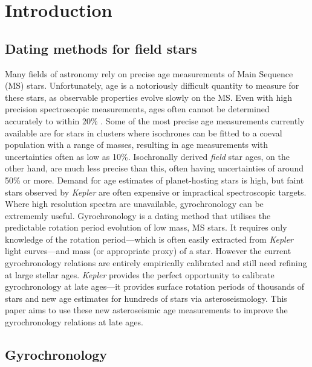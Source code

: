 \documentclass[useAMS, usenatbib]{mn2e}
\begin{document}
\section{Introduction}
\label{intro}
\subsection{Dating methods for field stars}

Many fields of astronomy rely on precise age measurements of Main Sequence
(MS) stars.
Unfortunately, age is a notoriously difficult quantity to measure for these
stars, as observable properties evolve slowly on the MS.
Even with high precision spectroscopic measurements, ages often cannot be
determined accurately to within 20\% \citep{Soderblom2010}.
Some of the most precise age measurements currently available are for stars in
clusters where isochrones can be fitted to a coeval population with a range of
masses, resulting in age measurements with uncertainties often as low as 10\%.
Isochronally derived {\it field} star ages, on the other hand, are much less
precise than this, often having uncertainties of around 50\% or more.
Demand for age estimates of planet-hosting stars is high, but faint stars
observed by {\it Kepler} are often expensive or impractical spectroscopic
targets.
Where high resolution spectra are unavailable, gyrochronology can be
extrememly useful.
Gyrochronology is a dating method that utilises the predictable rotation
period evolution of low mass, MS stars.
It requires only knowledge of the rotation period---which is often easily
extracted from {\it Kepler} light curves---and mass (or appropriate proxy) of
a star.
However the current gyrochronology relations are entirely empirically
calibrated and still need refining at large stellar ages.
{\it Kepler} provides the perfect opportunity to calibrate gyrochronology at
late ages---it provides surface rotation periods of thousands of stars and new
age estimates for hundreds of stars via asteroseismology.
This paper aims to use these new asteroseismic age measurements to improve the
gyrochronology relations at late ages.

\subsection{Gyrochronology}
\end{document}
